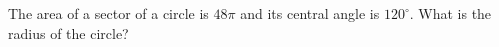 The area of a sector of a circle is $48\pi$ and its central angle is $120^\circ$. What is the radius of the circle?

